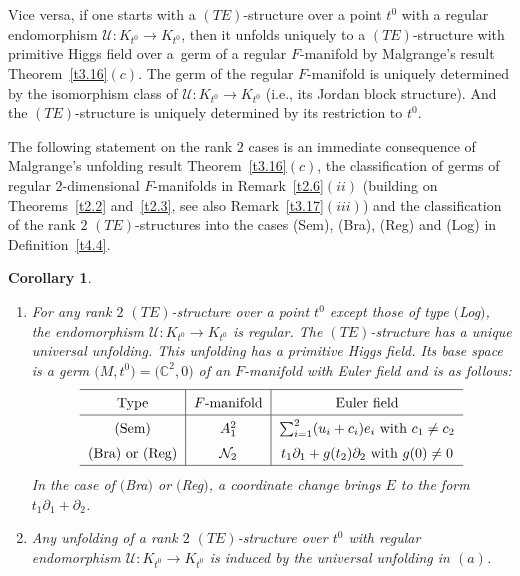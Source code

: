 \documentclass[10pt,a4paper]{amsart}
\numberwithin{equation}{section}
\numberwithin{figure}{section}
\newcommand{\C}{{\mathbb C}}
\newcommand{\NN}{{\mathcal N}}
\newcommand{\UU}{{\mathcal U}}
\newcommand{\paa}{\partial}
\newtheorem{Corollary}[Theorem]{Corollary}
\begin{document}
Vice versa, if one starts with a $(TE)$-structure
over a point $t^0$ with a regular endomorphism $\UU\colon
K_{t^0}\to K_{t^0}$,
then it unfolds uniquely to a $(TE)$-structure
with primitive Higgs field over a~germ of a regular $F$-manifold
by Malgrange's result Theorem~\ref{t3.16}$(c)$.
The germ of the regular $F$-manifold is uniquely determined by
the isomorphism class of $\UU\colon K_{t^0}\to K_{t^0}$
(i.e., its Jordan block structure).
And the $(TE)$-structure is uniquely determined by its
restriction to $t^0$.

The following statement on the rank $2$ cases
is an immediate consequence of Malgrange's unfolding result
Theorem~\ref{t3.16}$(c)$, the classification of germs
of regular 2-dimensional $F$-manifolds in Remark~\ref{t2.6}$(ii)$
(building on Theorems~\ref{t2.2} and~\ref{t2.3},
see also Remark~\ref{t3.17}$(iii)$) and the classification
of the rank $2$ $(TE)$-structures into the cases
(Sem), (Bra), (Reg) and (Log) in Definition~\ref{t4.4}.


\begin{Corollary}\label{t5.1} \qquad

\begin{enumerate}\itemsep=0pt
\item[$(a)$] For any rank $2$ $(TE)$-structure over a point $t^0$
except those of type $($Log$)$, the endomorphism
$\UU\colon K_{t^0}\to K_{t^0}$ is regular.
The $(TE)$-structure has a unique universal unfolding.
This unfolding has a primitive Higgs field.
Its base space is a germ $\big(M,t^0\big)=\big(\C^2,0\big)$
of an $F$-manifold with Euler field and is as follows:
\[
\def\arraystretch{1.5}
\begin{tabular}{c|c|c}
\hline
Type & $F$-manifold & Euler field
\\
\hline
$($Sem$)$ & $A_1^2$ & $\sum_{i=1}^2(u_i+c_i)e_i$ with $c_1\neq c_2$
\\
$($Bra$)$ or $($Reg$)$ & $\NN_2$ & $t_1\paa_1+g(t_2)\paa_2$ with $g(0)\neq 0$
\\
\hline
\end{tabular}
\]
In the case of $($Bra$)$ or $($Reg$)$, a coordinate change brings
$E$ to the form $t_1\paa_1+\paa_2$.

\item[$(b)$] Any unfolding of a rank $2$ $(TE)$-structure over $t^0$
with regular endomorphism $\UU\colon K_{t^0}\to K_{t^0}$
is induced by the universal unfolding in $(a)$.
\end{enumerate}
\end{Corollary}
\end{document}
